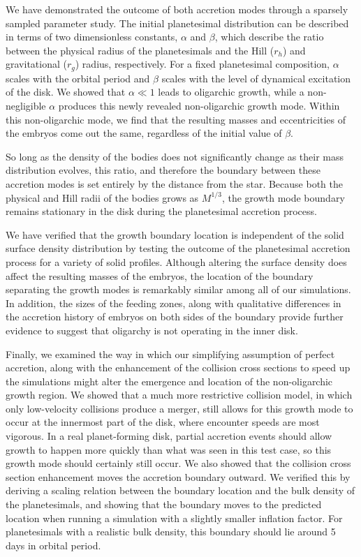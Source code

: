 \documentclass[twocolumn]{aastex63}
\begin{document}
We have demonstrated the outcome of both accretion modes through a
sparsely sampled parameter study. The initial planetesimal distribution can be described in terms of two dimensionless 
constants, $\alpha$ and $\beta$, which describe the ratio between the physical radius of the planetesimals and the Hill ($r_{h}$) 
and gravitational ($r_{g}$) radius, respectively. For a fixed planetesimal composition, $\alpha$ scales with the orbital period and 
$\beta$ scales with the level of dynamical excitation of the disk. We showed that $\alpha \ll 1$ leads to oligarchic growth, while a 
non-negligible $\alpha$ produces this newly revealed non-oligarchic growth mode. Within this non-oligarchic mode, we find that 
the resulting masses and eccentricities of the embryos come out the same, regardless of the initial value of $\beta$.

So long as the density of the bodies does not significantly change as
their mass distribution evolves, this ratio, and therefore the
boundary between these accretion modes is set entirely by the distance
from the star. Because both the physical and Hill radii of the bodies
grows as $M^{1/3}$, the growth mode boundary remains stationary
 in the disk during the planetesimal accretion process.
 
We have verified that the growth boundary location is independent of the
solid surface density distribution by testing the outcome of the planetesimal
accretion process for a variety of solid
profiles. Although altering the surface density does affect the
resulting masses of the embryos, the location of the boundary
separating the growth modes is remarkably similar among all of our simulations.
In addition, the sizes of the feeding zones, along with qualitative differences in the
accretion history of embryos on both sides of the boundary provide further evidence to
suggest that oligarchy is not operating in the inner disk.

Finally, we examined the way in which our simplifying assumption of perfect accretion, along with the enhancement of the 
collision cross sections to speed up the simulations might alter the emergence and location of the non-oligarchic growth region. 
We showed that a much more restrictive collision model, in which only low-velocity collisions produce a merger, still allows for 
this growth mode to occur at the innermost part of the disk, where encounter speeds are most vigorous. In a real planet-forming 
disk, partial accretion events should allow growth to happen more quickly than what was seen in this test case, so this growth 
mode should certainly still occur. We also showed that the collision cross section enhancement moves the accretion boundary 
outward. We verified this by deriving a scaling relation between the boundary location and the bulk density of the planetesimals, 
and showing that the boundary moves to the predicted location when running a simulation with a slightly smaller inflation factor. 
For planetesimals with a realistic bulk density, this boundary should lie around 5 days in orbital period.
\end{document}
